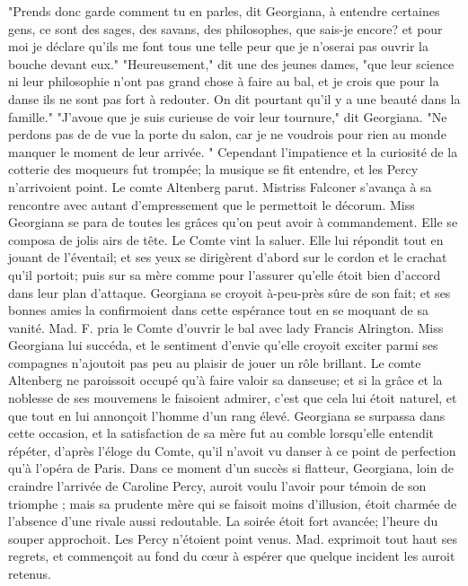 "Prends donc garde comment tu en parles, dit Georgiana, à entendre certaines gens, ce sont des sages, des savans, des philosophes, que sais-je encore? et pour moi je déclare qu'ils me font tous une telle peur que je n'oserai pas ouvrir la bouche devant eux."
"Heureusement," dit une des jeunes dames, "que leur science ni leur philosophie n'ont pas grand chose à faire au bal, et je crois que pour la danse ils ne sont pas fort à redouter. On dit pourtant qu'il y a une beauté dans la famille."
"J'avoue que je suis curieuse de voir leur tournure," dit Georgiana. "Ne perdons pas de\setcounter{page}{129} de vue la porte du salon, car je ne voudrois pour rien au monde manquer le moment de leur arrivée. "
Cependant l'impatience et la curiosité de la cotterie des moqueurs fut trompée; la musique se fit entendre, et les Percy n'arrivoient point.
Le comte Altenberg parut. Mistriss Falconer s'avança à sa rencontre avec autant d'empressement que le permettoit le décorum. Miss Georgiana se para de toutes les grâces qu'on peut avoir à commandement. Elle se composa de jolis airs de tête. Le Comte vint la saluer. Elle lui répondit tout en jouant de l'éventail; et ses yeux se dirigèrent d'abord sur le cordon et le crachat qu'il portoit; puis sur sa mère comme pour l'assurer qu'elle étoit bien d'accord dans leur plan d'attaque. Georgiana se croyoit à-peu-près sûre de son fait; et ses bonnes amies la confirmoient dans cette espérance tout en se moquant de sa vanité.
Mad. F. pria le Comte d'ouvrir le bal avec lady Francis Alrington. Miss Georgiana lui succéda, et le sentiment d'envie qu'elle croyoit exciter parmi ses compagnes n'ajoutoit pas peu au plaisir de jouer un\setcounter{page}{130} rôle brillant. Le comte Altenberg ne paroissoit occupé qu'à faire valoir sa danseuse; et si la grâce et la noblesse de ses mouvemens le faisoient admirer, c'est que cela lui étoit naturel, et que tout en lui annonçoit l'homme d'un rang élevé. Georgiana se surpassa dans cette occasion, et la satisfaction de sa mère fut au comble lorsqu'elle entendit répéter, d'après l'éloge du Comte, qu'il n'avoit vu danser à ce point de perfection qu'à l'opéra de Paris. Dans ce moment d'un succès si flatteur, Georgiana, loin de craindre l'arrivée de Caroline Percy, auroit voulu l'avoir pour témoin de son triomphe ; mais sa prudente mère qui se faisoit moins d'illusion, étoit charmée de l'absence d'une rivale aussi redoutable. La soirée étoit fort avancée; l'heure du souper approchoit. Les Percy n'étoient point venus. Mad. exprimoit tout haut ses regrets, et commençoit au fond du cœur à
espérer que quelque incident les auroit retenus.

